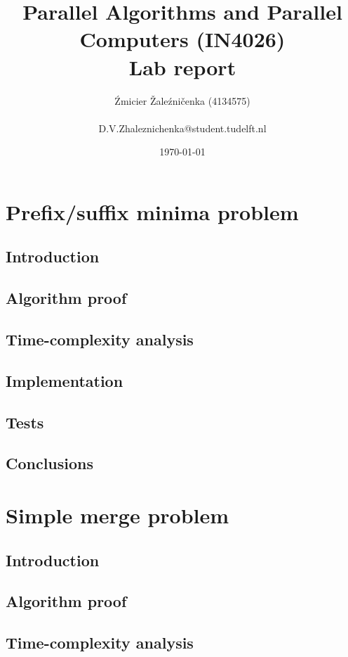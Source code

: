 \documentclass[a4paper,10pt,notitlepage]{article}
\title{Parallel Algorithms and Parallel Computers (IN4026) \\ Lab report}
\author{Źmicier Žaleźničenka (4134575) \\ \\
D.V.Zhaleznichenka@student.tudelft.nl}
\date{\today}
\begin{document}
\maketitle

\section{Prefix/suffix minima problem}

\subsection{Introduction}

\subsection{Algorithm proof}

\subsection{Time-complexity analysis}

\subsection{Implementation}

\subsection{Tests}

\subsection{Conclusions}


\section{Simple merge problem}

\subsection{Introduction}

\subsection{Algorithm proof}

\subsection{Time-complexity analysis}
\end{document}
